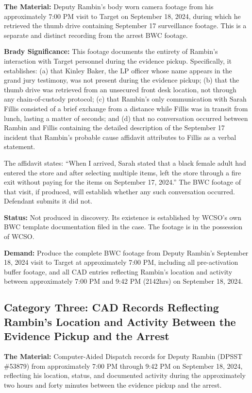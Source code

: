 \documentclass[12pt,letterpaper]{extarticle}
\begin{document}
	\textbf{The Material:} Deputy Rambin's body worn camera footage from his
	approximately 7:00 PM visit to Target on September 18, 2024, during which he
	retrieved the thumb drive containing September 17 surveillance footage. This is a
	separate and distinct recording from the arrest BWC footage.
	
	\textbf{Brady Significance:} This footage documents the entirety of Rambin's
	interaction with Target personnel during the evidence pickup. Specifically, it
	establishes: (a) that Kinley Baker, the LP officer whose name appears in the
	grand jury testimony, was not present during the evidence pickup; (b) that the
	thumb drive was retrieved from an unsecured front desk location, not through any
	chain-of-custody protocol; (c) that Rambin's only communication with Sarah Fillis
	consisted of a brief exchange from a distance while Fillis was in transit from
	lunch, lasting a matter of seconds; and (d) that no conversation occurred between
	Rambin and Fillis containing the detailed description of the September 17 incident
	that Rambin's probable cause affidavit attributes to Fillis as a verbal statement.
	
	The affidavit states: ``When I arrived, Sarah stated that a black female adult had
	entered the store and after selecting multiple items, left the store through a fire
	exit without paying for the items on September 17, 2024.'' The BWC footage of
	that visit, if produced, will establish whether any such conversation occurred.
	Defendant submits it did not.
	
	\textbf{Status:} Not produced in discovery. Its existence is established by
	WCSO's own BWC template documentation filed in the case. The footage is in the
	possession of WCSO.
	
	\textbf{Demand:} Produce the complete BWC footage from Deputy Rambin's
	September 18, 2024 visit to Target at approximately 7:00 PM, including all
	pre-activation buffer footage, and all CAD entries reflecting Rambin's location
	and activity between approximately 7:00 PM and 9:42 PM (2142hrs) on September 18,
	2024.
	
	\subsection{Category Three: CAD Records Reflecting Rambin's Location and
		Activity Between the Evidence Pickup and the Arrest}
	
	\textbf{The Material:} Computer-Aided Dispatch records for Deputy Rambin
	(DPSST \#53879) from approximately 7:00 PM through 9:42 PM on September 18, 2024,
	reflecting his location, status, and documented activity during the approximately
	two hours and forty minutes between the evidence pickup and the arrest.
	
\end{document}
